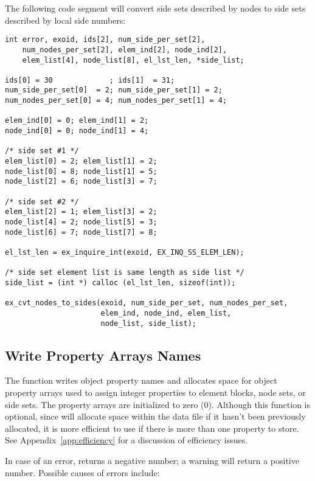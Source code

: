 The following code segment will convert side sets described
by nodes to side sets described by local side numbers:

\begin{lstlisting}
int error, exoid, ids[2], num_side_per_set[2],
    num_nodes_per_set[2], elem_ind[2], node_ind[2],
    elem_list[4], node_list[8], el_lst_len, *side_list;

ids[0] = 30             ; ids[1]  = 31;
num_side_per_set[0]  = 2; num_side_per_set[1] = 2;
num_nodes_per_set[0] = 4; num_nodes_per_set[1] = 4;

elem_ind[0] = 0; elem_ind[1] = 2;
node_ind[0] = 0; node_ind[1] = 4;

/* side set #1 */
elem_list[0] = 2; elem_list[1] = 2;
node_list[0] = 8; node_list[1] = 5;
node_list[2] = 6; node_list[3] = 7;

/* side set #2 */
elem_list[2] = 1; elem_list[3] = 2;
node_list[4] = 2; node_list[5] = 3;
node_list[6] = 7; node_list[7] = 8;

el_lst_len = ex_inquire_int(exoid, EX_INQ_SS_ELEM_LEN);

/* side set element list is same length as side list */
side_list = (int *) calloc (el_lst_len, sizeof(int));

ex_cvt_nodes_to_sides(exoid, num_side_per_set, num_nodes_per_set,
                      elem_ind, node_ind, elem_list,
                      node_list, side_list);
\end{lstlisting}



\subsection{Write Property Arrays Names}

The function  writes object property names
and allocates space for object property arrays used to assign integer
properties to element blocks, node sets, or side sets. The property
arrays are initialized to zero (0). Although this function is
optional, since  will allocate space within the
data file if it hasn't been previously allocated, it is more efficient
to use  if there is more than one property
to store. See Appendix~\ref{app:efficiency} for a discussion of
efficiency issues.

In case of an error,  returns a negative
number; a warning will return a positive number.  Possible causes of
errors include:

